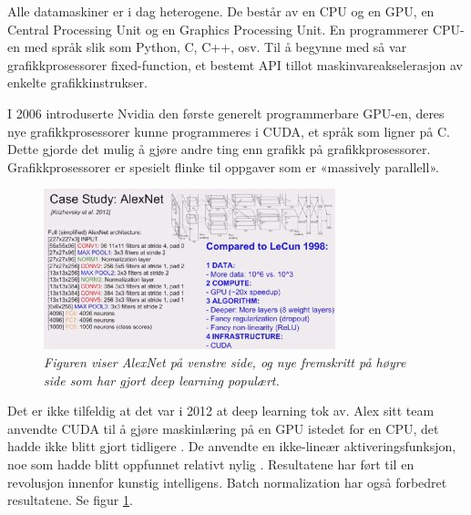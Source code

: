 Alle datamaskiner er i dag heterogene. De består av en CPU og en GPU, en Central Processing Unit og en Graphics Processing Unit. En programmerer CPU-en med språk slik som Python, C, C++, osv. Til å begynne med så var grafikkprosessorer fixed-function, et bestemt API tillot maskinvareakselerasjon av enkelte grafikkinstrukser. \cite{Buck 2006 s. 5}

I 2006 introduserte Nvidia den første generelt programmerbare GPU-en, deres nye grafikkprosessorer kunne programmeres i CUDA, et språk som ligner på C. Dette gjorde det mulig å gjøre andre ting enn grafikk på grafikkprosessorer. Grafikkprosessorer er spesielt flinke til oppgaver som er «massively parallell». \cite{Buck 2006 s. 1} %

\begin{figure}[t]
\begin{center} 
\includegraphics[scale=1.0]{figures/comparison}
\caption{\small \sl Figuren viser AlexNet på venstre side, og nye fremskritt på høyre side som har gjort deep learning populært. \cite{Karpathy 2014} \label{fig:comparison}}
\end{center} 
\end{figure} 

Det er ikke tilfeldig at det var i 2012 at deep learning tok av. Alex sitt team anvendte CUDA til å gjøre maskinlæring på en GPU istedet for en CPU, det hadde ikke blitt gjort tidligere \cite{Krizhevsky m.fl. 2012}. De anvendte en ikke-lineær aktiveringsfunksjon, noe som hadde blitt oppfunnet relativt nylig \cite{LeCun m.fl. 1998 s. 3}. Resultatene har ført til en revolusjon innenfor kunstig intelligens. Batch normalization har også forbedret resultatene. Se figur \ref{fig:comparison}. \cite{Ioffe og Szegedy 2015 s. 1}

